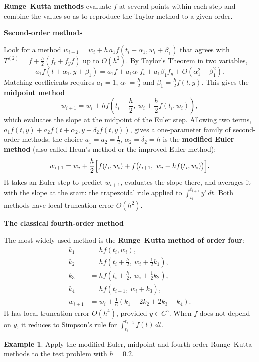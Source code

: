 \documentclass[11pt,a4paper]{article}
\numberwithin{equation}{section}
\theoremstyle{definition}
\newtheorem{exa}[thm]{Example}
\newcommand{\subhead}[1]{%
  \par\medskip\noindent\textbf{#1}\par\nobreak\smallskip}
\begin{document}
\textbf{Runge--Kutta methods} evaluate $f$ at several points within each step and combine the values so as to reproduce the Taylor method
to a given order.

\subhead{Second-order methods}
Look for a method $w_{i+1} = w_i+h\,a_1f(t_i+\alpha_1,w_i+\beta_1)$ that agrees with $T^{(2)} = f+\frac h2\left(f_t+f_yf\right)$ up to $O(h^2)$. By
Taylor's Theorem in two variables,
$$a_1f(t+\alpha_1,y+\beta_1) = a_1f+a_1\alpha_1f_t+a_1\beta_1f_y+O(\alpha_1^2+\beta_1^2) .$$
Matching coefficients requires $a_1 = 1$, $\alpha_1 = \frac h2$ and $\beta_1 = \frac h2f(t,y)$. This gives the \textbf{midpoint method}
$$w_{i+1} = w_i+hf\!\left(t_i+\frac h2,\ w_i+\frac h2f(t_i,w_i)\right),$$
which evaluates the slope at the midpoint of the Euler step. Allowing two terms, $a_1f(t,y)+a_2f(t+\alpha_2,y+\delta_2f(t,y))$, gives a
one-parameter family of second-order methods; the choice $a_1 = a_2 = \frac12$, $\alpha_2 = \delta_2 = h$ is the \textbf{modified Euler method}
(also called Heun's method or the improved Euler method):
$$w_{i+1} = w_i+\frac h2\Bigl[f(t_i,w_i)+f\bigl(t_{i+1},\ w_i+hf(t_i,w_i)\bigr)\Bigr].$$
It takes an Euler step to predict $w_{i+1}$, evaluates the slope there, and averages it with the slope at the start: the trapezoidal rule
applied to $\int_{t_i}^{t_{i+1}}y'\,dt$. Both methods have local truncation error $O(h^2)$.

\subhead{The classical fourth-order method}
The most widely used method is the \textbf{Runge--Kutta method of order four}:
\begin{align*}
k_1 &= hf(t_i,w_i),\\
k_2 &= hf\!\left(t_i+\frac h2,\ w_i+\frac12k_1\right),\\
k_3 &= hf\!\left(t_i+\frac h2,\ w_i+\frac12k_2\right),\\
k_4 &= hf(t_{i+1},\ w_i+k_3),\\
w_{i+1} &= w_i+\frac16(k_1+2k_2+2k_3+k_4).
\end{align*}
It has local truncation error $O(h^4)$, provided $y\in C^5$. When $f$ does not depend on $y$, it reduces to Simpson's rule for
$\int_{t_i}^{t_{i+1}}f(t)\,dt$.

\begin{exa}
\label{exa:rk4}
Apply the modified Euler, midpoint and fourth-order Runge--Kutta methods to the test problem with $h = 0.2$.
\end{exa}
\end{document}
